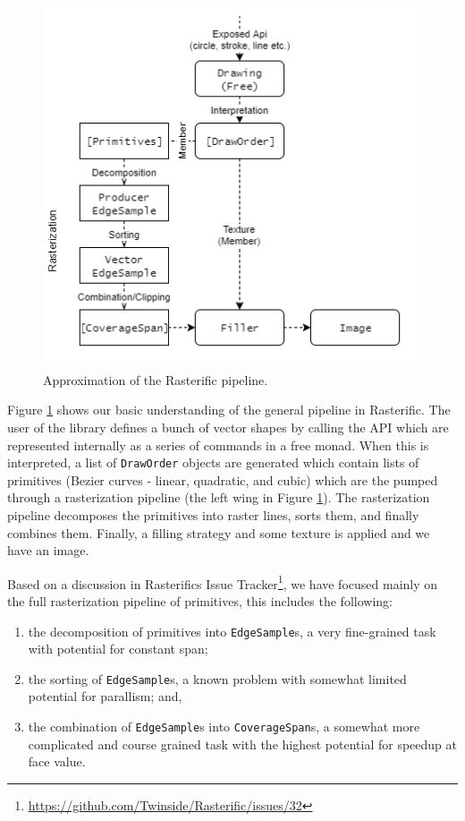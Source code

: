 \documentclass[12pt, a4paper]{article}
\begin{document}
\begin{figure}[h!]
  \centering
  \includegraphics[width=.6\linewidth]{../rasterific-pipeline}
  \caption{Approximation of the Rasterific pipeline.}
  \label{fig:rasterific-pipeline}
\end{figure}

Figure \ref{fig:rasterific-pipeline} shows our basic understanding of the general pipeline in Rasterific. The user of the library defines a bunch of vector shapes by calling the
API which are represented internally as a series of commands in a free monad. When this is interpreted, a list of \texttt{DrawOrder} objects are generated which contain lists
of primitives (Bezier curves - linear, quadratic, and cubic) which are the pumped through a rasterization pipeline (the left wing in Figure \ref{fig:rasterific-pipeline}). The rasterization
pipeline decomposes the primitives into raster lines, sorts them, and finally combines them. Finally, a filling strategy and some texture is applied and we have an image.

Based on a discussion in Rasterifics Issue Tracker\footnote{\url{https://github.com/Twinside/Rasterific/issues/32}}, we have focused mainly on the full rasterization pipeline of
primitives, this includes the following:
\begin{enumerate}
\item the decomposition of primitives into \texttt{EdgeSample}s, a very fine-grained task with potential for constant span;
\item the sorting of \texttt{EdgeSample}s, a known problem with somewhat limited potential for parallism; and,
\item the combination of \texttt{EdgeSample}s into \texttt{CoverageSpan}s, a somewhat more complicated and course grained task with the highest potential for speedup at face value.
\end{enumerate}
\end{document}
